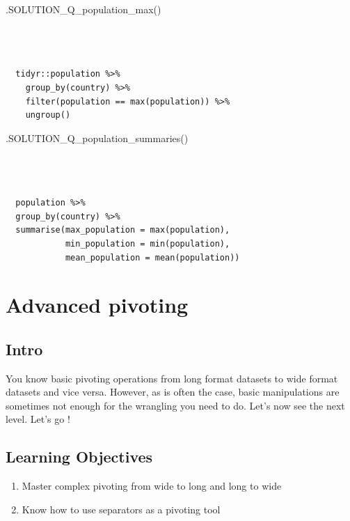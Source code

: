 \documentclass[
  letterpaper,
  DIV=11,
  numbers=noendperiod]{scrreprt}
\newenvironment{Shaded}{\begin{snugshade}}{\end{snugshade}}
\newcommand{\FunctionTok}[1]{\textcolor[rgb]{0.28,0.35,0.67}{#1}}
\newcommand{\NormalTok}[1]{\textcolor[rgb]{0.00,0.23,0.31}{#1}}
\begin{document}
\begin{Shaded}
\begin{Highlighting}[]
\FunctionTok{.SOLUTION\_Q\_population\_max}\NormalTok{()}
\end{Highlighting}
\end{Shaded}

\begin{verbatim}


  
  tidyr::population %>% 
    group_by(country) %>% 
    filter(population == max(population)) %>% 
    ungroup()
\end{verbatim}

\begin{Shaded}
\begin{Highlighting}[]
\FunctionTok{.SOLUTION\_Q\_population\_summaries}\NormalTok{()}
\end{Highlighting}
\end{Shaded}

\begin{verbatim}


  
  population %>% 
  group_by(country) %>% 
  summarise(max_population = max(population), 
            min_population = min(population), 
            mean_population = mean(population))
\end{verbatim}

\chapter{Advanced pivoting}\label{advanced-pivoting}

\section{Intro}\label{intro-3}

You know basic pivoting operations from long format datasets to wide
format datasets and vice versa. However, as is often the case, basic
manipulations are sometimes not enough for the wrangling you need to do.
Let's now see the next level. Let's go !

\section{Learning Objectives}\label{learning-objectives-13}

\begin{enumerate}
\def\labelenumi{\arabic{enumi}.}
\item
  Master complex pivoting from wide to long and long to wide
\item
  Know how to use separators as a pivoting tool
\end{enumerate}
\end{document}
